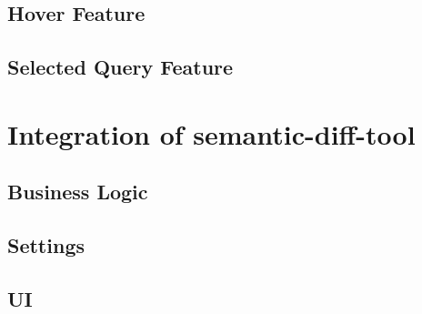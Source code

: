 \subsection{Hover Feature}
\subsection{Selected Query Feature}

\section{Integration of semantic-diff-tool}
\subsection{Business Logic}
\subsection{Settings}
\subsection{UI}